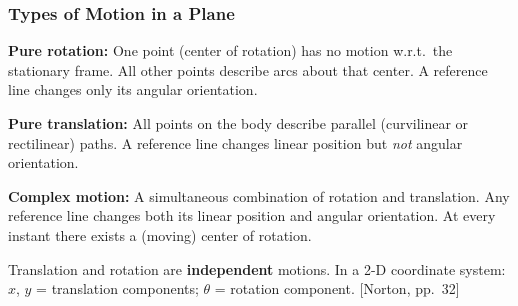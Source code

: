\documentclass[10pt,aspectratio=43]{beamer}
\newcommand{\pref}[1]{\vfill\hfill{\scriptsize\color{gray}[Norton, pp.~#1]}}
\begin{document}
\begin{frame}
\frametitle{Types of Motion in a Plane}

\begin{yellowbox}
\textbf{Pure rotation:} One point (center of rotation) has no motion w.r.t.\ the stationary frame. All other points describe arcs about that center. A reference line changes only its angular orientation.
\end{yellowbox}

\vspace{4pt}
\begin{yellowbox}
\textbf{Pure translation:} All points on the body describe parallel (curvilinear or rectilinear) paths. A reference line changes linear position but \emph{not} angular orientation.
\end{yellowbox}

\vspace{4pt}
\begin{yellowbox}
\textbf{Complex motion:} A simultaneous combination of rotation and translation. Any reference line changes both its linear position and angular orientation. At every instant there exists a (moving) center of rotation.
\end{yellowbox}

\vspace{4pt}
Translation and rotation are \textbf{independent} motions. In a 2-D coordinate system: $x$, $y$ = translation components; $\theta$ = rotation component.
\pref{32}
\end{frame}

\end{document}
